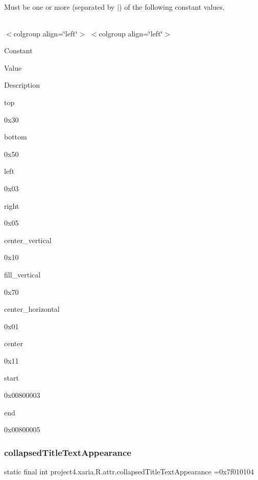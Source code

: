 Must be one or more (separated by \textquotesingle{}$\vert$\textquotesingle{}) of the following constant values.

\tabulinesep=1mm
\begin{longtabu} spread 0pt [c]{*{0}{|X[-1]}|}
\hline
\end{longtabu}
$<$colgroup align=\char`\"{}left\char`\"{}$>$ $<$colgroup align=\char`\"{}left\char`\"{}$>$ 

Constant

Value

Description 

{\ttfamily top}

0x30

{\ttfamily bottom}

0x50

{\ttfamily left}

0x03

{\ttfamily right}

0x05

{\ttfamily center\+\_\+vertical}

0x10

{\ttfamily fill\+\_\+vertical}

0x70

{\ttfamily center\+\_\+horizontal}

0x01

{\ttfamily center}

0x11

{\ttfamily start}

0x00800003

{\ttfamily end}

0x00800005\mbox{\label{classproject4_1_1xaria_1_1R_1_1attr_a4b638279c01852806429d4c21ffda47d}} 
\subsubsection{\texorpdfstring{collapsed\+Title\+Text\+Appearance}{collapsedTitleTextAppearance}}
{\footnotesize\ttfamily static final int project4.\+xaria.\+R.\+attr.\+collapsed\+Title\+Text\+Appearance =0x7f010104\hspace{0.3cm}{\ttfamily [static]}}

